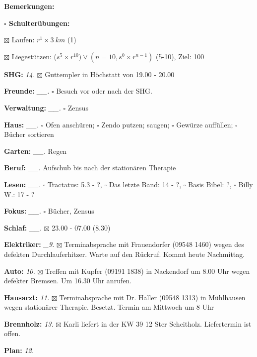 \documentclass[10pt,a4paper]{article}
\newcommand\prop[1] {{\color {alizarin} {\bf #1}}}        %
\newcommand\opti[1] {{\color {amethyst} {\bf #1}}}        %
\newcommand\mand[1] {{\color {burntorange} {\bf #1}}}     %
\newcommand\bottomspace{\vskip 4pt}
\newcommand\n[1] { {\sl #1.} \hskip 5pt }
\begin{document}
\begin{mdframed}[style=daystyle]
\begin{labeling}{{\mand {Bemerkungen:}}}
\begin{minipage}{0.75\textwidth}
\begin{labeling}{\prop {$\square$ {Schulterübungen:}}}
      \item[$\boxtimes$ Laufen:]          $r^1 \times 3\ km$ (1)
      \item[$\boxtimes$ Liegestützen:]    ($s^5 \times r^{10}) \vee (n=10, s^0 \times r^{n-1})$ (5-10), Ziel: 100
      \end{labeling}
    \end{minipage}
    \bottomspace    
  \item[{\mand {SHG:}}]            \n{14} $\boxtimes$ Guttempler in Höchstatt von 19.00 - 20.00
  \item[{\mand {Freunde:}}]      \n{\_\_} $\square$ Besuch vor oder nach der SHG.
  \item[{\mand {Verwaltung:}}]   \n{\_\_} $\square$ Zensus
  \item[{\mand {Haus:}}]         \n{\_\_} $\square$ Ofen anschüren; $\square$ Zendo putzen;
      saugen; $\square$ Gewürze auffüllen; $\square$ Bücher sortieren
  \item[{\mand {Garten:}}]       \n{\_\_} Regen
  \item[{\mand {Beruf:}}]        \n{\_\_} Aufschub bis nach der stationären Therapie
  \item[{\mand {Lesen:}}]        \n{\_\_} $\square$ Tractatus: 5.3 - ?,
      $\square$ Das letzte Band: 14 - ?, $\square$ Basis Bibel: ?, $\square$ Billy W.: 17 - ?
  \item[{\mand {Fokus:}}]        \n{\_\_} $\square$ Bücher, Zensus
  \item[{\mand {Schlaf:}}]       \n{\_\_} $\boxtimes$ 23.00 - 07.00 (8.30)
  \item[{\opti {Elektriker:}}]    \n{\_9} $\boxtimes$ Terminabsprache mit Frauendorfer (09548 1460) wegen
      des defekten Durchlauferhitzer. Warte auf den Rückruf. Kommt heute Nachmittag.
  \item[{\opti {Auto:}}]           \n{10} $\boxtimes$ Treffen mit Kupfer (09191 1838) in Nackendorf um 8.00 Uhr
      wegen defekter Bremsen. Um 16.30 Uhr anrufen.
  \item[{\opti {Hausarzt:}}]       \n{11} $\boxtimes$ Terminabsprache mit Dr. Haller (09548 1313) in Mühlhausen
    wegen stationärer Therapie. Besetzt. Termin am Mittwoch um 8 Uhr
  \item[{\opti {Brennholz:}}]      \n{13} $\boxtimes$ Karli liefert in der KW 39 12 Ster Scheitholz.
    Liefertermin ist offen.
  \item[{\mand {Plan:}}]           \n{12}

\end{labeling}
\end{mdframed}
\end{document}
